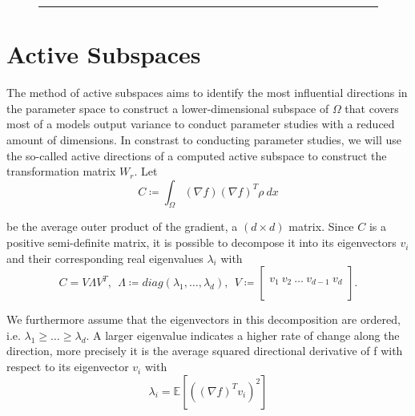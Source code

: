 \documentclass[
  a4paper,  %
  twoside,  %
  bibliography=totoc,
  headsepline,
  cleardoublepage=empty,
  parskip=half,
  draft=false
]{scrbook}
\newcommand{\delimit}{{\color{charcoal}\noindent\rule{\textwidth}{1pt}}}
\begin{document}
\begin{mdframed}[style=style]
\begin{figure}[H]
\begin{subfigure}{.5\textwidth}
\end{subfigure}
\vspace{2.5mm}
\delimit
{}
\label{fig:trans_vis}
\end{figure}
\end{mdframed}

\section{Active Subspaces}
\label{sec:as}

The method of active subspaces \cite{CG15} aims to identify the most influential directions in the parameter space to construct a lower-dimensional subspace of $\Omega$ that covers most of a models output variance to conduct parameter studies with a reduced amount of dimensions.
In constrast to conducting parameter studies, we will use the so-called active directions of a computed active subspace to construct the transformation matrix $W_r$.
Let
\begin{equation}
C \coloneqq \int_{\Omega} (\nabla f) (\nabla f)^T \rho ~ dx
\label{eq:as_c}
\end{equation}

be the average outer product of the gradient, a $(d \times d)$ matrix.
Since $C$ is a positive semi-definite matrix, it is possible to decompose it into its eigenvectors $v_i$ and their corresponding real eigenvalues $\lambda_i$ with
\begin{equation}
C = V \Lambda V^T, ~~ \Lambda \coloneqq diag(\lambda_1, \dots, \lambda_d), ~~ V \coloneqq
  \begin{bmatrix}
  \\
    v_1 ~ v_2 ~ \dots ~ v_{d-1} ~ v_d\\
    \\
  \end{bmatrix}.
\nonumber
\end{equation}

We furthermore assume that the eigenvectors in this decomposition are ordered, i.e. $\lambda_1 \geq \dots \geq \lambda_d$.
A larger eigenvalue indicates a higher rate of change along the direction, more precisely it is the average squared directional derivative of f with respect to its eigenvector $v_i$ \cite{CG14} with
\begin{equation}
\lambda_i=\mathds{E}[((\nabla f)^T v_i)^2]
\label{eigenvalues}
\end{equation}
\end{document}
